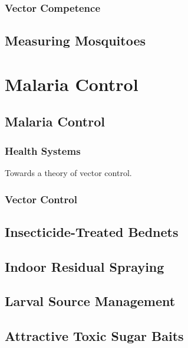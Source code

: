 \documentclass[
]{book}
\begin{document}
\section{Vector Competence}\label{vector-competence}

\chapter{Measuring Mosquitoes}\label{measuring-mosquitoes}

\part{Malaria Control}\label{part-malaria-control}

\chapter{Malaria Control}\label{malaria-control-1}

\section{Health Systems}\label{health-systems}

Towards a theory of vector control.

\section{Vector Control}\label{vector-control}

\chapter{Insecticide-Treated Bednets}\label{insecticide-treated-bednets}

\chapter{Indoor Residual Spraying}\label{indoor-residual-spraying}

\chapter{Larval Source Management}\label{larval-source-management-1}

\chapter{Attractive Toxic Sugar Baits}\label{attractive-toxic-sugar-baits}
\end{document}
